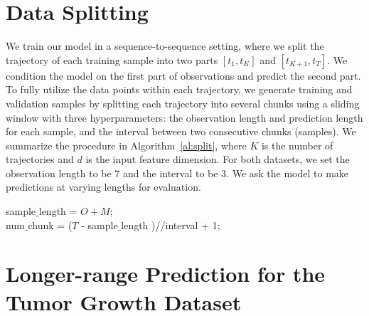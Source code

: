 \section{Data Splitting}\label{sec:training_details}
We train our model in a sequence-to-sequence setting, where we split the trajectory of each training sample into two parts $[t_1,t_K]$ and $[t_{K+1},t_T]$. We condition the model on the first part of observations and predict the second part. To fully utilize the data points within each trajectory, we generate training and validation samples by splitting each trajectory into several chunks using a sliding window with three hyperparameters: the observation length and prediction length for each sample, and the interval between two consecutive chunks (samples). We summarize the procedure in Algorithm~\ref{al:split}, where $K$ is the number of trajectories and $d$ is the input feature dimension. For both datasets, we set the observation length to be 7 and the interval to be 3. We ask the model to make predictions at varying lengths for evaluation.

\begin{algorithm}[htbp]
\caption{Data Splitting Procedure.}
\label{al:split}
sample$\_$length = $O+M$;\\
num$\_$chunk = ($T$ - sample$\_$length )//interval + 1;\\
\end{algorithm}





    





\section{Longer-range Prediction for the Tumor Growth Dataset}\label{sec:appendix_tumor_results}

